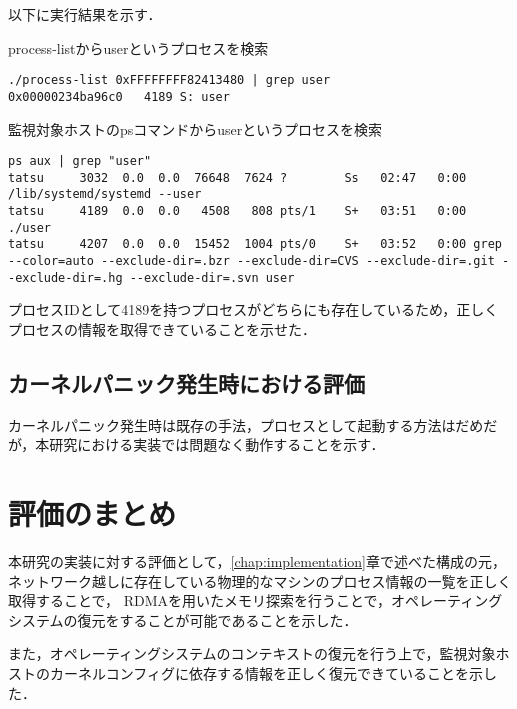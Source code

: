 以下に実行結果を示す．

\begin{itembox}[l]{process-listからuserというプロセスを検索}
    \begin{verbatim}
./process-list 0xFFFFFFFF82413480 | grep user
0x00000234ba96c0   4189 S: user
    \end{verbatim}
\end{itembox}

\begin{itembox}[l]{監視対象ホストのpsコマンドからuserというプロセスを検索}
    \begin{verbatim}
ps aux | grep "user"
tatsu     3032  0.0  0.0  76648  7624 ?        Ss   02:47   0:00 /lib/systemd/systemd --user
tatsu     4189  0.0  0.0   4508   808 pts/1    S+   03:51   0:00 ./user
tatsu     4207  0.0  0.0  15452  1004 pts/0    S+   03:52   0:00 grep --color=auto --exclude-dir=.bzr --exclude-dir=CVS --exclude-dir=.git --exclude-dir=.hg --exclude-dir=.svn user
    \end{verbatim}
\end{itembox}

プロセスIDとして4189を持つプロセスがどちらにも存在しているため，正しくプロセスの情報を取得できていることを示せた．

\subsection{カーネルパニック発生時における評価}

カーネルパニック発生時は既存の手法，プロセスとして起動する方法はだめだが，本研究における実装では問題なく動作することを示す．

\section{評価のまとめ}

本研究の実装に対する評価として，\ref{chap:implementation}章で述べた構成の元，ネットワーク越しに存在している物理的なマシンのプロセス情報の一覧を正しく取得することで，
RDMAを用いたメモリ探索を行うことで，オペレーティングシステムの復元をすることが可能であることを示した．

また，オペレーティングシステムのコンテキストの復元を行う上で，監視対象ホストのカーネルコンフィグに依存する情報を正しく復元できていることを示した．

